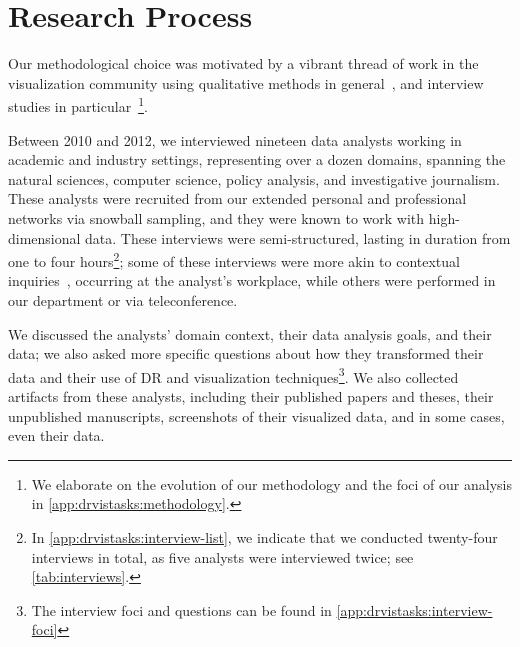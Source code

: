 
\section{Research Process}
\label{drvistasks:methods}


Our methodological choice was motivated by a vibrant thread of work in the visualization community using qualitative methods in general~\cite{Carpendale2008,Isenberg2008,Tory2008}, and interview studies in particular~\cite{Kandel2012,Kang2011}\footnote{We elaborate on the evolution of our methodology and the foci of our analysis in \autoref{app:drvistasks:methodology}.}.

Between 2010 and 2012, we interviewed nineteen data analysts working in academic and industry settings, representing over a dozen domains, spanning the natural sciences, computer science, policy analysis, and investigative journalism. 
These analysts were recruited from our extended personal and professional networks via snowball sampling, and they were known to work with high-dimensional data.
These interviews were semi-structured, lasting in duration from one to four hours\footnote{In \autoref{app:drvistasks:interview-list}, we indicate that we conducted twenty-four interviews in total, as five analysts were interviewed twice; see \autoref{tab:interviews}.}; some of these interviews were more akin to contextual inquiries~\cite{Holtzblatt1993}, occurring at the analyst's workplace, while others were performed in our department or via teleconference.

We discussed the analysts' domain context, their data analysis goals, and their data; we also asked more specific questions about how they transformed their data and their use of \ac{DR} and visualization techniques\footnote{The interview foci and questions can be found in \autoref{app:drvistasks:interview-foci}}.
We also collected artifacts from these analysts, including their published papers and theses, their unpublished manuscripts, screenshots of their visualized data, and in some cases, even their data.

